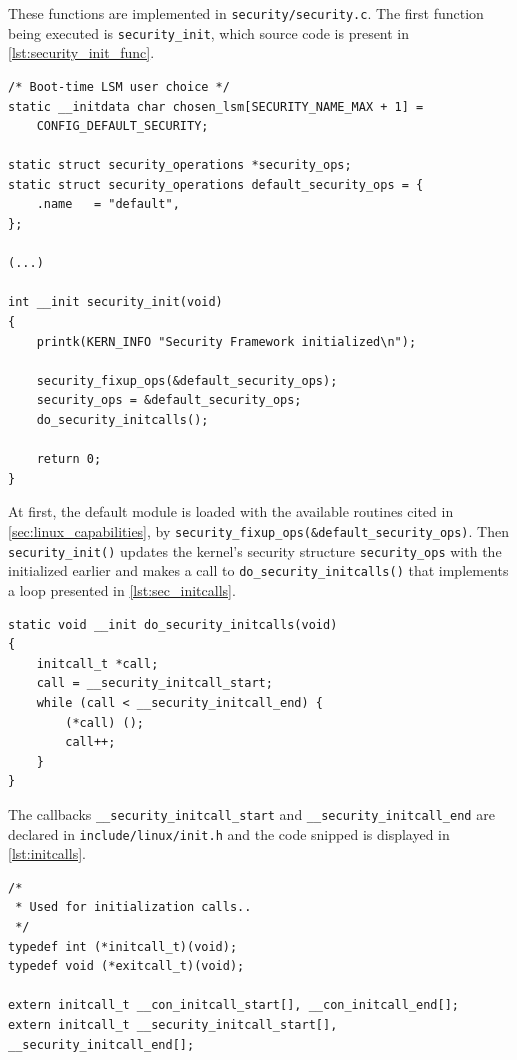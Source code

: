 \noindent
These functions are implemented in \texttt{security/security.c}. The first function being executed is \texttt{security\_init}, which source code is present in \autoref{lst:security_init_func}.

\begin{lstlisting}[frame=none, numbers=none, caption=\texttt{security\_init} function (Linux kernel v3.11), label=lst:security_init_func]
/* Boot-time LSM user choice */
static __initdata char chosen_lsm[SECURITY_NAME_MAX + 1] =
	CONFIG_DEFAULT_SECURITY;

static struct security_operations *security_ops;
static struct security_operations default_security_ops = {
	.name	= "default",
};

(...)

int __init security_init(void)
{
	printk(KERN_INFO "Security Framework initialized\n");

	security_fixup_ops(&default_security_ops);
	security_ops = &default_security_ops;
	do_security_initcalls();

	return 0;
}
\end{lstlisting}

\noindent
At first, the default module is loaded with the available routines cited in \autoref{sec:linux_capabilities}, by \texttt{security\_fixup\_ops(&default\_security\_ops)}. Then \texttt{security\_init()} updates the kernel's security structure \texttt{security\_ops} with the initialized earlier and makes a call to \texttt{do\_security\_initcalls()} that implements a loop presented in \autoref{lst:sec_initcalls}.

\begin{lstlisting}[frame=none, numbers=none, caption=\texttt{do\_security\_initcalls} function (Linux kernel v3.11), label=lst:sec_initcalls]
static void __init do_security_initcalls(void)
{
	initcall_t *call;
	call = __security_initcall_start;
	while (call < __security_initcall_end) {
		(*call) ();
		call++;
	}
}
\end{lstlisting}

\noindent
The callbacks \texttt{\_\_security\_initcall\_start} and \texttt{\_\_security\_initcall\_end} are declared in \texttt{include/linux/init.h} and the code snipped is displayed in \autoref{lst:initcalls}.

\begin{lstlisting}[frame=none, numbers=none, caption=\texttt{init} callbacks (Linux kernel v3.11), label=lst:initcalls]
/*
 * Used for initialization calls..
 */
typedef int (*initcall_t)(void);
typedef void (*exitcall_t)(void);

extern initcall_t __con_initcall_start[], __con_initcall_end[];
extern initcall_t __security_initcall_start[], __security_initcall_end[];
\end{lstlisting}


